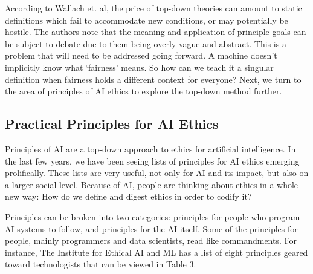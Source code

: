 \documentclass{svproc}
\begin{document}
According to Wallach et. al, \cite{Wallach2008MachineFaculties} the price of top-down theories can amount to static definitions which fail to accommodate new conditions, or may potentially be hostile. The authors note that the meaning and application of principle goals can be subject to debate due to them being overly vague and abstract. \cite{Wallach2008MachineFaculties} This is a problem that will need to be addressed going forward. A machine doesn’t implicitly know what ‘fairness’ means. So how can we teach it a singular definition when fairness holds a different context for everyone? Next, we turn to the area of principles of AI ethics to explore the top-down method further.

\subsection{Practical Principles for AI Ethics 
}

Principles of AI are a top-down approach to ethics for artificial intelligence. In the last few years, we have been seeing lists of principles for AI ethics emerging prolifically. These lists are very useful, not only for AI and its impact, but also on a larger social level. Because of AI, people are thinking about ethics in a whole new way: How do we define and digest ethics in order to codify it? 

Principles can be broken into two categories: principles for people who program AI systems to follow, and principles for the AI itself. Some of the principles for people, mainly programmers and data scientists, read like commandments. For instance, The Institute for Ethical AI and ML \cite{TheInstituteforEthicalAiMachineLearning2021TheSystems.} has a list of eight principles geared toward technologists that can be viewed in Table 3.
\end{document}
